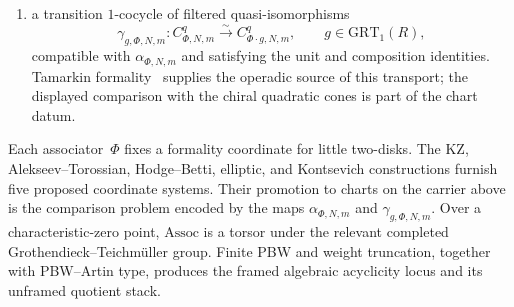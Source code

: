 \begin{definition}
\begin{enumerate}[label=\textup{(\alph*)}]
 fixed by~$\Phi$, equivalently a compatible system of
 null-homotopies
 $h_{\Phi,N,m}\colon T_{\Phi,N,m}\simeq 0$ whose images
 under~$\alpha_{\Phi,N,m}$ trivialise the quadratic comparison
 cones;
\item a transition $1$-cocycle of filtered quasi-isomorphisms
 \[
 \gamma_{g,\Phi,N,m}\colon
 C^q_{\Phi,N,m}\xrightarrow{\sim}C^q_{\Phi\cdot g,N,m},
 \qquad g\in\mathrm{GRT}_1(R),
 \]
 compatible with $\alpha_{\Phi,N,m}$ and satisfying the unit and
 composition identities.  Tamarkin formality~\cite{Tamarkin03}
 supplies the operadic source of this transport; the displayed
 comparison with the chiral quadratic cones is part of the chart
 datum.
\end{enumerate}
\end{definition}

Each associator~$\Phi$ fixes a formality coordinate for little
two-disks.  The KZ, Alekseev--Torossian, Hodge--Betti, elliptic, and
Kontsevich constructions furnish five proposed coordinate systems.
Their promotion to charts on the carrier above is the comparison
problem encoded by the maps $\alpha_{\Phi,N,m}$ and
$\gamma_{g,\Phi,N,m}$.  Over a characteristic-zero point,
$\mathrm{Assoc}$ is a torsor under the relevant completed
Grothendieck--Teichm\"uller group.  Finite PBW and weight truncation,
together with PBW--Artin type, produces the framed algebraic
acyclicity locus and its unframed quotient stack.

